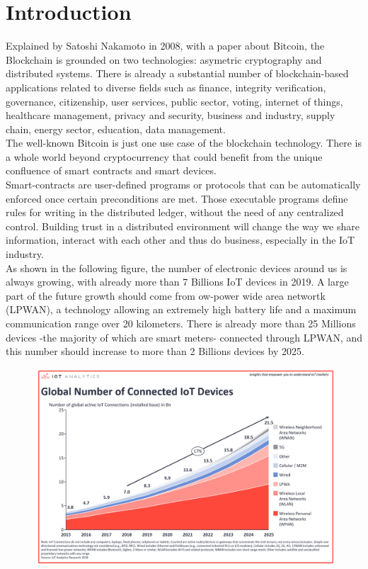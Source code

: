 \documentclass[11pt]{article}
\begin{document}
\section{Introduction}
Explained by Satoshi Nakamoto in 2008, with a paper about Bitcoin, the Blockchain is grounded on two technologies: asymetric cryptography and distributed systems. There is already a substantial number of blockchain-based applications related to diverse fields such as finance, integrity verification, governance, citizenship, user services, public sector, voting, internet of things, healthcare management, privacy and security, business and industry, supply chain, energy sector, education, data management.\cite{1} \\
The well-known Bitcoin is just one use case of the blockchain technology. There is a whole world beyond cryptocurrency that could benefit from the unique confluence of smart contracts and smart devices.\\
Smart-contracts are user-defined programs or protocols that can be automatically enforced once certain preconditions are met. Those executable programs define rules for writing in the distributed ledger, without the need of any centralized control. Building trust in a distributed environment will change the way we share information, interact with each other and thus do business, especially in the IoT industry.\cite{2}\\
As shown in the following figure\cite{3}, the number of electronic devices around us is always growing, with already more than 7 Billions IoT devices in 2019. A large part of the future growth should come from ow-power wide area networtk (LPWAN), a technology allowing an extremely high battery life and a maximum communication range over 20 kilometers. There is already more than 25 Millions devices -the majority of which are smart meters- connected through LPWAN, and this number should increase to more than 2 Billions devices by 2025.\\
\begin{figure}[h]
	\centering
	\includegraphics[width=0.8\linewidth]{stateofIoT2018.png}
\end{figure}\\
\end{document}
